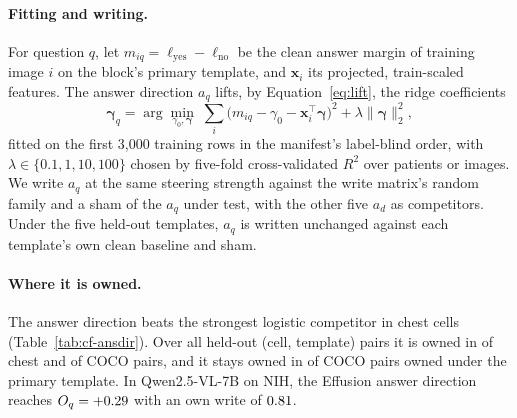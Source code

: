 \paragraph{Fitting and writing.} For question $q$, let $m_{iq}=\ell_{\mathrm{yes}}-\ell_{\mathrm{no}}$ be the clean answer margin of training image $i$ on the block's primary template, and $\boldsymbol x_i$ its projected, train-scaled features. The answer direction $a_q$ lifts, by Equation~\ref{eq:lift}, the ridge coefficients
\begin{equation}
\boldsymbol\gamma_q=\arg\min_{\gamma_0,\boldsymbol\gamma}\;\sum_{i}\bigl(m_{iq}-\gamma_0-\boldsymbol x_i^{\top}\boldsymbol\gamma\bigr)^2+\lambda\lVert\boldsymbol\gamma\rVert_2^2 ,
\label{eq:answer-direction}
\end{equation}
fitted on the first 3{,}000 training rows in the manifest's label-blind order, with $\lambda\in\{0.1,1,10,100\}$ chosen by five-fold cross-validated $R^2$ over patients or images. We write $a_q$ at the same steering strength against the write matrix's random family and a sham of the $a_q$ under test, with the other five $a_d$ as competitors. Under the five held-out templates, $a_q$ is written unchanged against each template's own clean baseline and sham.

\paragraph{Where it is owned.} The answer direction beats the strongest logistic competitor in \cfAnsChestBeats{} chest cells (Table~\ref{tab:cf-ansdir}). Over all held-out (cell, template) pairs it is owned in \cfAnsdirtChestOwnedPairs{} of \cfAnsdirtChestPairsAll{} chest and \cfAnsdirtCocoOwnedPairs{} of \cfAnsdirtCocoPairsAll{} COCO pairs, and it stays owned in \cfAnsdirtCocoKept{} of \cfAnsdirtCocoKeptN{} COCO pairs owned under the primary template. In Qwen2.5-VL-7B on NIH, the Effusion answer direction reaches $O_q=+0.29$ with an own write of $0.81$.



